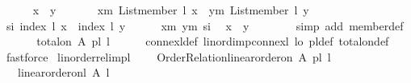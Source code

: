 \begin{isabellebody}
\ \ \ \ \isamarkupfalse%
\ x\ \ y\ \isanewline
\ \ \ \ \isamarkupfalse%
\ xm{\isacharcolon}{\kern0pt}\ {\isachardoublequoteopen}List{\isachardot}{\kern0pt}member\ l\ x{\isachardoublequoteclose}\ \ ym{\isacharcolon}{\kern0pt}\ {\isachardoublequoteopen}List{\isachardot}{\kern0pt}member\ l\ y{\isachardoublequoteclose}\isanewline
\ \ \ \ \isamarkupfalse%
\ si{\isacharcolon}{\kern0pt}\ {\isachardoublequoteopen}index\ l\ x\ {\isacharequal}{\kern0pt}\ index\ l\ y{\isachardoublequoteclose}\isanewline
\ \ \ \ \isamarkupfalse%
\ xm\ ym\ si\ \isamarkupfalse%
\ {\isachardoublequoteopen}x\ {\isacharequal}{\kern0pt}\ y{\isachardoublequoteclose}\isanewline
\ \ \ \ \ \ \isamarkupfalse%
\ {\isacharparenleft}{\kern0pt}simp\ add{\isacharcolon}{\kern0pt}\ member{\isacharunderscore}{\kern0pt}def{\isacharparenright}{\kern0pt}\isanewline
\ \ \isamarkupfalse%
\isanewline
{}\isamarkupfalse%
\isanewline
\ \ \isamarkupfalse%
\ {\isachardoublequoteopen}total{\isacharunderscore}{\kern0pt}on\ A\ {\isacharparenleft}{\kern0pt}pl{\isacharunderscore}{\kern0pt}{\isasymalpha}\ l{\isacharparenright}{\kern0pt}{\isachardoublequoteclose}\isanewline
\ \ \ \ \isamarkupfalse%
\ connex{\isacharunderscore}{\kern0pt}l{\isacharunderscore}{\kern0pt}def\ lin{\isacharunderscore}{\kern0pt}ord{\isacharunderscore}{\kern0pt}imp{\isacharunderscore}{\kern0pt}connex{\isacharunderscore}{\kern0pt}l\ lo\ pl{\isacharunderscore}{\kern0pt}{\isasymalpha}{\isacharunderscore}{\kern0pt}def\ total{\isacharunderscore}{\kern0pt}on{\isacharunderscore}{\kern0pt}def\ \isamarkupfalse%
\ fastforce\isanewline
{}\isamarkupfalse%
%
\endisatagproof
{\isafoldproof}%
%
\isadelimproof
\isanewline
%
\endisadelimproof
\isanewline
{}\isamarkupfalse%
\ linorder{\isacharunderscore}{\kern0pt}rel{\isacharunderscore}{\kern0pt}imp{\isacharunderscore}{\kern0pt}l{\isacharcolon}{\kern0pt}\ \isanewline
\ \ \ {\isachardoublequoteopen}Order{\isacharunderscore}{\kern0pt}Relation{\isachardot}{\kern0pt}linear{\isacharunderscore}{\kern0pt}order{\isacharunderscore}{\kern0pt}on\ A\ {\isacharparenleft}{\kern0pt}pl{\isacharunderscore}{\kern0pt}{\isasymalpha}\ l{\isacharparenright}{\kern0pt}{\isachardoublequoteclose}\isanewline
\ \ \ {\isachardoublequoteopen}linear{\isacharunderscore}{\kern0pt}order{\isacharunderscore}{\kern0pt}on{\isacharunderscore}{\kern0pt}l\ A\ l{\isachardoublequoteclose}\isanewline

\end{isabellebody}
